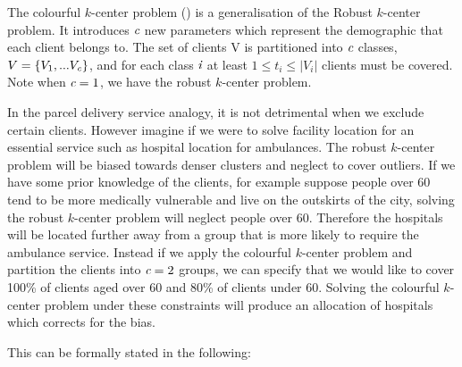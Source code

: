 The colourful $k$-center problem (\cite{bandyapadhyay_constant_2019}) is a generalisation of the Robust $k$-center problem. It introduces $\emph{c}$ new parameters which represent the demographic that each client belongs to. The set of clients V is partitioned into $\emph{c}$ classes, $V=\{V_1,... V_{\emph{c}}\}$, and for each class $\emph{i}$ at least $1\leq t_i \leq |V_i|$ clients must be covered. Note when $\emph{c}=1$, we have the robust $k$-center problem.

In the parcel delivery service analogy, it is not detrimental when we exclude certain clients. However imagine if we were to solve facility location for an essential service such as hospital location for ambulances. The robust $k$-center problem will be biased towards denser clusters and neglect to cover outliers. If we have some prior knowledge of the clients, for example suppose people over 60 tend to be more medically vulnerable and live on the outskirts of the city, solving the robust $k$-center problem will neglect people over 60. Therefore the hospitals will be located further away from a group that is more likely to require the ambulance service. Instead if we apply the colourful $k$-center problem and partition the clients into $\emph{c}=2$ groups, we can specify that we would like to cover 100\% of clients aged over 60 and 80\% of clients under 60. Solving the colourful $k$-center problem under these constraints will produce an allocation of hospitals which corrects for the bias.

This can be formally stated in the following:


